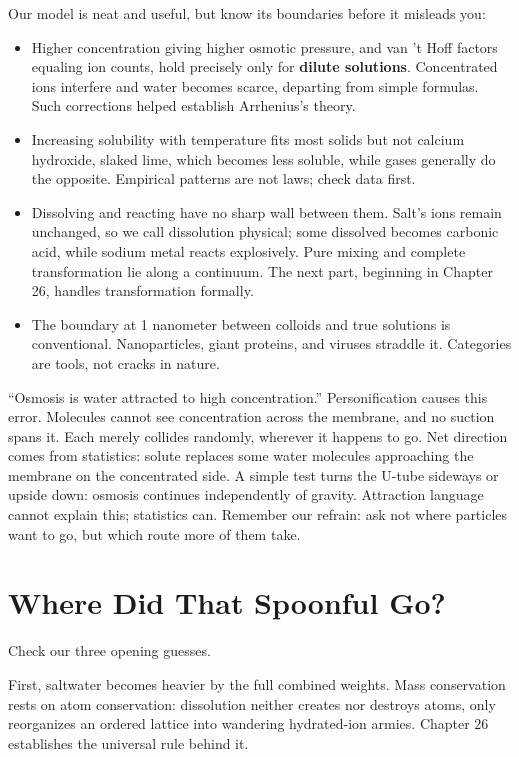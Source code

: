 Our model is neat and useful, but know its boundaries before it misleads you:

\begin{itemize}[itemsep=2pt]
\item Higher concentration giving higher osmotic pressure, and van 't Hoff factors equaling ion counts, hold precisely only for \textbf{dilute solutions}. Concentrated ions interfere and water becomes scarce, departing from simple formulas. Such corrections helped establish Arrhenius's theory.
\item Increasing solubility with temperature fits most solids but not calcium hydroxide, slaked lime, which becomes less soluble, while gases generally do the opposite. Empirical patterns are not laws; check data first.
\item Dissolving and reacting have no sharp wall between them. Salt's ions remain unchanged, so we call dissolution physical; some dissolved  becomes carbonic acid, while sodium metal reacts explosively. Pure mixing and complete transformation lie along a continuum. The next part, beginning in Chapter 26, handles transformation formally.
\item The boundary at 1 nanometer between colloids and true solutions is conventional. Nanoparticles, giant proteins, and viruses straddle it. Categories are tools, not cracks in nature.
\end{itemize}

\begin{wuqu}
``Osmosis is water attracted to high concentration.'' Personification causes this error. Molecules cannot see concentration across the membrane, and no suction spans it. Each merely collides randomly, wherever it happens to go. Net direction comes from statistics: solute replaces some water molecules approaching the membrane on the concentrated side. A simple test turns the U-tube sideways or upside down: osmosis continues independently of gravity. Attraction language cannot explain this; statistics can. Remember our refrain: ask not where particles want to go, but which route more of them take.
\end{wuqu}

\section{Where Did That Spoonful Go?}

Check our three opening guesses.

First, saltwater becomes heavier by the full combined weights. Mass conservation rests on atom conservation: dissolution neither creates nor destroys atoms, only reorganizes an ordered lattice into wandering hydrated-ion armies. Chapter 26 establishes the universal rule behind it.

